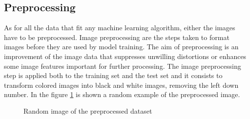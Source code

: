 \subsection{Preprocessing}
As for all the data that fit any machine learning algorithm, either the images have to be preprocessed. Image preprocessing are the steps taken to format images before they are used by model training. The aim of preprocessing is an improvement of the image data that suppresses unwilling distortions or enhances some image features important for further processing. The image preprocessing step is applied both to the training set and the test set and it consists to transform colored images into black and white images, removing the left down number. In the figure \ref{fig:photoPrep} is shown a random example of the preprocessed image.
\begin{figure}[h!]
    \photoPrep
    \caption{Random image of the preprocessed dataset}
    \label{fig:photoPrep}
\end{figure}